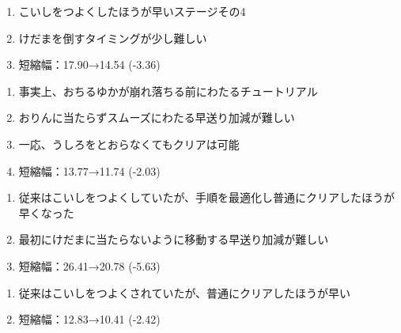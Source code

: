 \clearpage
\begin{enumerate}[label={\sarrow}]
\item こいしをつよくしたほうが早いステージその4
\item けだまを倒すタイミングが少し難しい
\item 短縮幅：17.90→14.54 (-3.36)
\end{enumerate}



\begin{enumerate}[label={\sarrow}]
\item 事実上、おちるゆかが崩れ落ちる前にわたるチュートリアル
\item おりんに当たらずスムーズにわたる早送り加減が難しい
\item 一応、うしろをとおらなくてもクリアは可能
\item 短縮幅：13.77→11.74 (-2.03)
\end{enumerate}



\begin{enumerate}[label={\sarrow}]
\item 従来はこいしをつよくしていたが、手順を最適化し普通にクリアしたほうが早くなった
\item 最初にけだまに当たらないように移動する早送り加減が難しい
\item 短縮幅：26.41→20.78 (-5.63)
\end{enumerate}



\begin{enumerate}[label={\sarrow}]
\item 従来はこいしをつよくされていたが、普通にクリアしたほうが早い
\item 短縮幅：12.83→10.41 (-2.42)
\end{enumerate}



